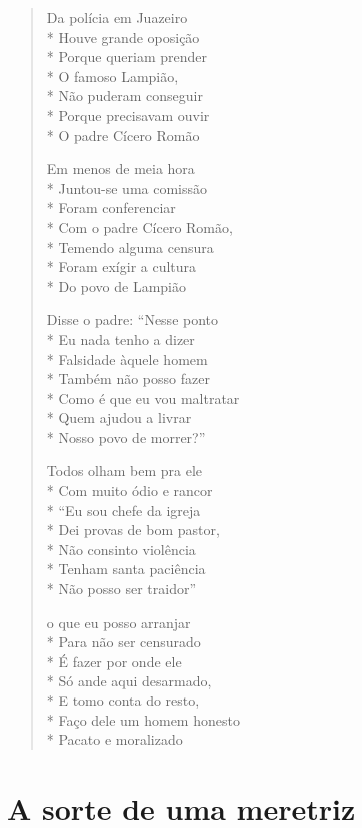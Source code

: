 \begin{verse}
Da polícia em Juazeiro\\*
Houve grande oposição\\*
Porque queriam prender\\*
O famoso Lampião,\\*
Não puderam conseguir\\*
Porque precisavam ouvir\\*
O padre Cícero Romão

Em menos de meia hora\\*
Juntou-se uma comissão\\*
Foram conferenciar\\*
Com o padre Cícero Romão,\\*
Temendo alguma censura\\*
Foram exígir a cultura\\*
Do povo de Lampião

Disse o padre: ``Nesse ponto\\*
Eu nada tenho a dizer\\*
Falsidade àquele homem\\*
Também não posso fazer\\*
Como é que eu vou maltratar\\*
Quem ajudou a livrar\\*
Nosso povo de morrer?''

Todos olham bem pra ele\\*
Com muito ódio e rancor\\*
``Eu sou chefe da igreja\\*
Dei provas de bom pastor,\\*
Não consinto violência\\*
Tenham santa paciência\\*
Não posso ser traidor''

o que eu posso arranjar\\*
Para não ser censurado\\*
É fazer por onde ele\\*
Só ande aqui desarmado,\\*
E tomo conta do resto,\\*
Faço dele um homem honesto\\*
Pacato e moralizado

\end{verse}

\chapter{A sorte de uma meretriz}

